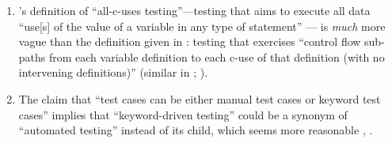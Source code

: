 \begin{enumerate}
    \item %
          \citeauthor{IEEE2017}'s definition of ``all-c-uses testing''---testing
          that aims to execute all data ``use[s] of the value of a variable in
          any type of statement'' \citeyearpar[p.~83]{IEEE2017}---%
          is \emph{much} more vague than the definition given in
          \citeyearpar[p.~27]{IEEE2021}: testing that exercises ``control flow
          sub-paths from each variable definition to each c-use of that
          definition (with no intervening definitions)'' (similar in
          \citealp[p.~425]{vanVliet2000}; \citealp[p.~479]{PetersAndPedrycz2000}).
    \item %
          The claim that ``test cases can be either manual test cases or
          keyword test cases'' \citep[p.~6]{IEEE2016} implies that ``keyword-driven
          testing'' could be a synonym of ``automated testing'' instead of its
          child, which seems more reasonable \ifnotpaper
              \citetext{\citeyear[p.~4]{IEEE2016}; \citeyear[p.~35]{IEEE2022}}%
          \else\cite[p.~35]{IEEE2022}, \cite[p.~4]{IEEE2016}\fi.


\end{enumerate}
